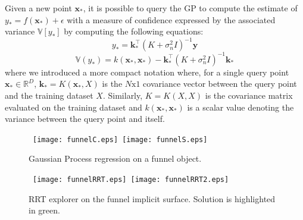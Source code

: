 Given a new point $\mathbf{x}_*$, it is possible to query the GP to compute the estimate of $y_*=f(\mathbf{x}_*)+\epsilon$ with a measure of confidence expressed by the associated variance $\mathbb{V}[y_*]$ by computing the following equations:
$$
y_*=\mathbf{k}_*^\top(K+\sigma_n^2I)^{-1}\mathbf{y}
$$
$$
\mathbb{V}(y_*)=k(\mathbf{x}_*,\mathbf{x}_*)-\mathbf{k}_*^\top(K+\sigma_n^2I)^{-1}\mathbf{k}_*
$$
where we introduced a more compact notation where, for a single query point $\mathbf{x}_*\in\mathbb{R}^D$, $\mathbf{k}_*=K(\mathbf{x}_*,X)$ is the $N\text{x}1$ covariance vector between the query point and the training dataset $X$. Similarly, $K=K(X,X)$ is the covariance matrix evaluated on the training dataset and $k(\mathbf{x}_*,\mathbf{x}_*)$ is a scalar value denoting the variance between the query point and itself.

\begin{figure}[h]
    \centering
    \mbox
    {
        \texttt{[image: funnelC.eps]}
        \texttt{[image: funnelS.eps]}
    }
    \caption{Gaussian Process regression on a funnel object. }
    \label{fig:GPfunnel}
\end{figure}
\begin{figure}[h]
    \centering
    \mbox
    {
    \texttt{[image: funnelRRT.eps]}
    \texttt{[image: funnelRRT2.eps]}
    }
    \caption{RRT explorer on the funnel implicit surface. Solution is highlighted in green.}
    \label{fig:RRTfunnel}
\end{figure}


























